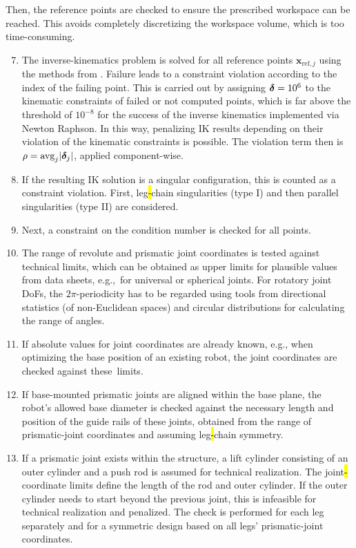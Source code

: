 %
Then, the reference points are checked to ensure the prescribed workspace can be reached.
This avoids completely discretizing the workspace volume, which is too \mbox{time-consuming}. %
%
\begin{enumerate}
  \setcounter{enumi}{6}
  \item \label{itm:constr_ik_succ} The inverse-kinematics problem is solved for all reference points $\bm{x}_{\mathrm{ref},j}$ using the methods from \cite{SchapplerTapOrt2019c}. {Failure leads to a constraint violation according to the index of the failing point. This is carried out by assigning $\boldsymbol{\delta}=10^6$ to the kinematic constraints of failed or not computed points, which is far above the threshold of $10^{-8}$ for the success of the inverse kinematics implemented via Newton Raphson. {In} this way, penalizing IK results depending on their violation of the kinematic constraints is possible. The violation term then is $\rho=\mathrm{avg}_j |\boldsymbol{\delta}_j|$, applied component-wise.}
  \item \label{itm:constr_ik_sing} If the resulting IK solution is a singular configuration, this is counted as a constraint violation. First, leg\hl{-}chain singularities (type I) and then parallel singularities (type II) are considered.
  \item \label{itm:constr_ik_jac} Next, a constraint on the  condition number is checked for all points.
  \item \label{itm:constr_jointrange} The range of revolute and prismatic joint coordinates is tested against technical limits, which can be obtained as upper limits for plausible values from data sheets, e.g.,~for universal or spherical joints. For rotatory joint DoFs, the $2\pi$-periodicity has to be regarded using tools from directional statistics (of non-Euclidean spaces) and circular distributions for calculating the range of angles.
  \item \label{itm:constr_jointlim} If absolute values for joint coordinates are already known, e.g., when optimizing the base position of an existing robot, the joint coordinates are checked against these~limits.
  \item \label{itm:constr_prismaticbase} If base-mounted prismatic joints are aligned within the base plane, the robot's allowed base diameter is checked against the necessary length and position of the guide rails of these joints, obtained from the range of prismatic-joint coordinates and assuming leg\hl{-}chain symmetry.
  \item \label{itm:constr_prismaticcylinder} If a prismatic joint exists within the structure, a lift cylinder consisting of an outer cylinder and a push rod is assumed for technical realization. The joint\hl{-}coordinate limits define the length of the rod and outer cylinder. If the outer cylinder needs to start beyond the previous joint, this is infeasible for technical realization and penalized. The check is performed for each leg separately and for a symmetric design based on all legs' prismatic-joint coordinates.

\end{enumerate}
